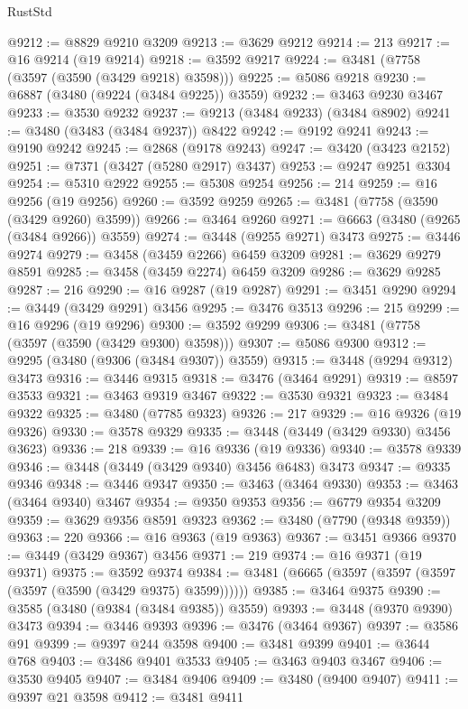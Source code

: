 \begin{lexlean}{RustStd}
\begin{coremodule}
{\begin{coremodule}
{{{{{{{{{{{{{{{{{{{{{{{{{{{{{{{{{{{{{{{{{{{{{{{{{{{{{{{{{{{{{{{{{{{{{{{{{{{{{{{{{{{{{@9212 := @8829 @9210 @3209
@9213 := @3629 @9212
@9214 := 213
@9217 := @16 @9214 (@19 @9214)
@9218 := @3592 @9217
@9224 := @3481 (@7758 (@3597 (@3590 (@3429 @9218) @3598)))
@9225 := @5086 @9218
@9230 := @6887 (@3480 (@9224 (@3484 @9225)) @3559)
@9232 := @3463 @9230 @3467
@9233 := @3530 @9232
@9237 := @9213 (@3484 @9233) (@3484 @8902)
@9241 := @3480 (@3483 (@3484 @9237)) @8422
@9242 := @9192 @9241
@9243 := @9190 @9242
@9245 := @2868 (@9178 @9243)
@9247 := @3420 (@3423 @2152)
@9251 := @7371 (@3427 (@5280 @2917) @3437)
@9253 := @9247 @9251 @3304
@9254 := @5310 @2922
@9255 := @5308 @9254
@9256 := 214
@9259 := @16 @9256 (@19 @9256)
@9260 := @3592 @9259
@9265 := @3481 (@7758 (@3590 (@3429 @9260) @3599))
@9266 := @3464 @9260
@9271 := @6663 (@3480 (@9265 (@3484 @9266)) @3559)
@9274 := @3448 (@9255 @9271) @3473
@9275 := @3446 @9274
@9279 := @3458 (@3459 @2266) @6459 @3209
@9281 := @3629 @9279 @8591
@9285 := @3458 (@3459 @2274) @6459 @3209
@9286 := @3629 @9285
@9287 := 216
@9290 := @16 @9287 (@19 @9287)
@9291 := @3451 @9290
@9294 := @3449 (@3429 @9291) @3456
@9295 := @3476 @3513
@9296 := 215
@9299 := @16 @9296 (@19 @9296)
@9300 := @3592 @9299
@9306 := @3481 (@7758 (@3597 (@3590 (@3429 @9300) @3598)))
@9307 := @5086 @9300
@9312 := @9295 (@3480 (@9306 (@3484 @9307)) @3559)
@9315 := @3448 (@9294 @9312) @3473
@9316 := @3446 @9315
@9318 := @3476 (@3464 @9291)
@9319 := @8597 @3533
@9321 := @3463 @9319 @3467
@9322 := @3530 @9321
@9323 := @3484 @9322
@9325 := @3480 (@7785 @9323)
@9326 := 217
@9329 := @16 @9326 (@19 @9326)
@9330 := @3578 @9329
@9335 := @3448 (@3449 (@3429 @9330) @3456 @3623)
@9336 := 218
@9339 := @16 @9336 (@19 @9336)
@9340 := @3578 @9339
@9346 := @3448 (@3449 (@3429 @9340) @3456 @6483) @3473
@9347 := @9335 @9346
@9348 := @3446 @9347
@9350 := @3463 (@3464 @9330)
@9353 := @3463 (@3464 @9340) @3467
@9354 := @9350 @9353
@9356 := @6779 @9354 @3209
@9359 := @3629 @9356 @8591 @9323
@9362 := @3480 (@7790 (@9348 @9359))
@9363 := 220
@9366 := @16 @9363 (@19 @9363)
@9367 := @3451 @9366
@9370 := @3449 (@3429 @9367) @3456
@9371 := 219
@9374 := @16 @9371 (@19 @9371)
@9375 := @3592 @9374
@9384 := @3481 (@6665 (@3597 (@3597 (@3597 (@3597 (@3590 (@3429 @9375) @3599))))))
@9385 := @3464 @9375
@9390 := @3585 (@3480 (@9384 (@3484 @9385)) @3559)
@9393 := @3448 (@9370 @9390) @3473
@9394 := @3446 @9393
@9396 := @3476 (@3464 @9367)
@9397 := @3586 @91
@9399 := @9397 @244 @3598
@9400 := @3481 @9399
@9401 := @3644 @768
@9403 := @3486 @9401 @3533
@9405 := @3463 @9403 @3467
@9406 := @3530 @9405
@9407 := @3484 @9406
@9409 := @3480 (@9400 @9407)
@9411 := @9397 @21 @3598
@9412 := @3481 @9411
}}}}}}}}}}}}}}}}}}}}}}}}}}}}}}}}}}}}}}}}}}}}}}}}}}}}}}}}}}}}}}}}}}}}}}}}}}}}}}}}}}}}}
\end{coremodule}}
\end{coremodule}
\end{lexlean}

